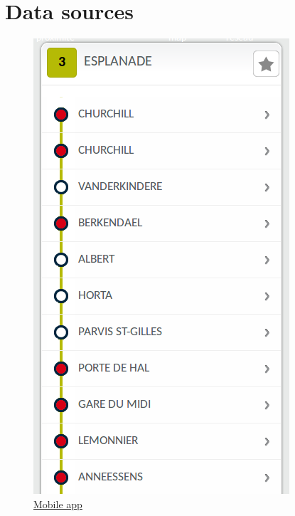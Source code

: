 \documentclass[11pt]{article}%
\begin{document}
\section{Data sources}

\begin{minipage}{0.25\textwidth}
  \begin{figure}[H]
    \center
    \includegraphics[width=\textwidth]{images/stibmobile.png}
    \caption{\href{http://m.stib.be/}{Mobile app}}
  \end{figure}
\end{minipage}\hfill
\end{document}
